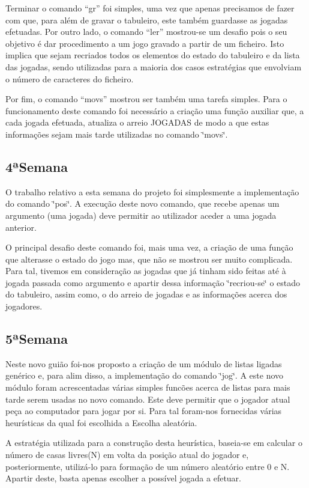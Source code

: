 Terminar o comando “gr” foi simples, uma vez que apenas precisamos de fazer com que, para além de gravar o tabuleiro, este também guardasse as jogadas efetuadas. Por outro lado, o comando “ler” mostrou-\/se um desafio pois o seu objetivo é dar procedimento a um jogo gravado a partir de um ficheiro. Isto implica que sejam recriados todos os elementos do estado do tabuleiro e da lista das jogadas, sendo utilizadas para a maioria dos casos estratégias que envolviam o número de caracteres do ficheiro.

Por fim, o comando “movs” mostrou ser também uma tarefa simples. Para o funcionamento deste comando foi necessário a criação uma função auxiliar que, a cada jogada efetuada, atualiza o arreio J\+O\+G\+A\+D\+AS de modo a que estas informações sejam mais tarde utilizadas no comando \char`\"{}movs\char`\"{}.

\subsection*{4ª\+Semana}

O trabalho relativo a esta semana do projeto foi simplesmente a implementação do comando \char`\"{}pos\char`\"{}. A execução deste novo comando, que recebe apenas um argumento (uma jogada) deve permitir ao utilizador aceder a uma jogada anterior.

O principal desafio deste comando foi, mais uma vez, a criação de uma função que alterasse o estado do jogo mas, que não se mostrou ser muito complicada. Para tal, tivemos em consideração as jogadas que já tinham sido feitas até à jogada passada como argumento e apartir dessa informação \char`\"{}recriou-\/se\char`\"{} o estado do tabuleiro, assim como, o do arreio de jogadas e as informações acerca dos jogadores.

\subsection*{5ª\+Semana}

Neste novo guião foi-\/nos proposto a criação de um módulo de listas ligadas genérico e, para alim disso, a implementação do comando \char`\"{}jog\char`\"{}. A este novo módulo foram acrescentadas várias simples funcões acerca de listas para mais tarde serem usadas no novo comando. Este deve permitir que o jogador atual peça ao computador para jogar por si. Para tal foram-\/nos fornecidas várias heurísticas da qual foi escolhida a Escolha aleatória.

A estratégia utilizada para a construção desta heurística, baseia-\/se em calcular o número de casas livres(\+N) em volta da posição atual do jogador e, posteriormente, utilizá-\/lo para formação de um número aleatório entre 0 e N. Apartir deste, basta apenas escolher a possível jogada a efetuar. 